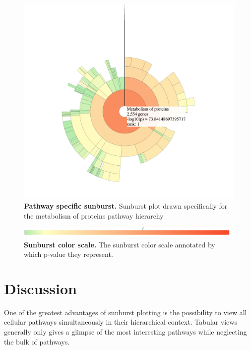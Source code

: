 \documentclass[11pt]{article}
\begin{document}
\begin{figure}[htp]
\begin{center}
\includegraphics[width=0.96\linewidth,clip]{./img/mop_specific.png}
\caption{\label{fig:mop_specific} {\bf Pathway specific sunburst.} Sunburst plot drawn specifically for the metabolism of proteins pathway hierarchy}
\end{center}
\end{figure}

\begin{figure}[htp]
\begin{center}
\includegraphics[width=0.96\linewidth,clip]{./img/color_scale.png}
\caption{\label{fig:color_scale} {\bf Sunburst color scale.} The sunburst color scale annotated by which p-value they represent.}
\end{center}
\end{figure}

\section*{Discussion}
  One of the greatest advantages of sunburst plotting is the possibility to view all cellular pathways simultaneously in their hierarchical context. Tabular views generally only gives a glimpse of the most interesting pathways while neglecting the bulk of pathways.
\end{document}

